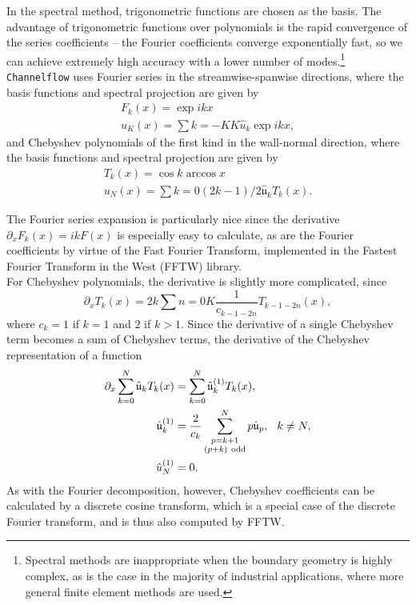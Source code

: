 In the spectral method, trigonometric functions are chosen as the basis. The advantage of trigonometric functions over polynomials is the rapid convergence of the series coefficients -- the Fourier coefficients converge exponentially fast, so we can achieve extremely high accuracy with a lower number of modes.\footnote{Spectral methods are inappropriate when the boundary geometry is highly complex, as is the case in the majority of industrial applications, where more general finite element methods are used.} {\tt Channelflow} uses Fourier series in the streamwise-spanwise directions, where the basis functions and spectral projection are given by 
\begin{align}
F_k(x) = \exp{ikx}\\
u_K(x) = \sum{k=-K}{K}\hat{u}_k\exp{ikx},
\end{align}
and Chebyshev polynomials of the first kind in the wall-normal direction, where the basis functions and spectral projection are given by
\begin{align}
T_k(x) = \cos{k\arccos{x}}\\
u_N(x) = \sum{k=0}{(2k-1)/2}\hat{\mathfrak{u}}_kT_k(x).
\end{align}
\par The Fourier series expansion is particularly nice since the derivative $\partial_x F_k(x) = ikF(x)$ is especially easy to calculate, as are the Fourier coefficients by virtue of the Fast Fourier Transform, implemented in the Fastest Fourier Transform in the West (FFTW) library.\\

For Chebyshev polynomials, the derivative is slightly more complicated, since 
\begin{equation}
\partial_x T_k(x) = 2k\sum{n=0}{K}{\frac{1}{c_{k-1-2n}} T_{k-1-2n}(x)},
\end{equation}
where $c_k = 1$ if $k=1$ and $2$ if $k > 1$. Since the derivative of a single Chebyshev term becomes a sum of Chebyshev terms, the derivative of the Chebyshev representation of a function 
\begin{align}
\partial_x \sum{k=0}{N}\hat{\mathfrak{u}}_kT_k(x) &= \sum{k=0}{N}\hat{\mathfrak{u}}_k^{(1)}T_k(x),\\
\hat{\mathfrak{u}}_k^{(1)} &= \frac{2}{c_k}\sum{\substack{p = k+1\\(p+k) \mathrm{~odd}}}{N} p \hat{\mathfrak{u}}_p, \hspace{0.25cm} k \neq N,\\
\hat{u}^{(1)}_N &= 0.
\end{align}
As with the Fourier decomposition, however, Chebyshev coefficients can be calculated by a discrete cosine transform, which is a special case of the discrete Fourier transform, and is thus also computed by FFTW. 


